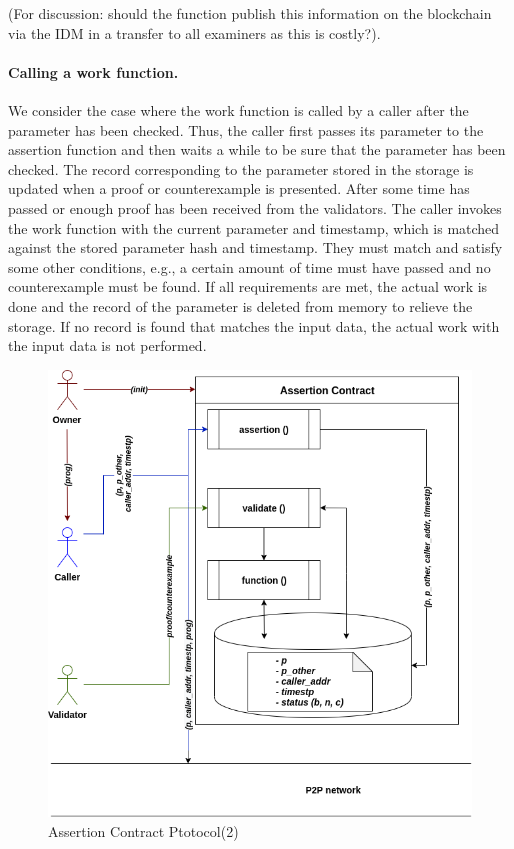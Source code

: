 \documentclass[runningheads]{llncs}
\begin{document}
(For discussion: should the function publish this information on the blockchain via the IDM in a transfer to all examiners as this is costly?).

\paragraph{Calling a work function.}
We consider the case where the work function is called by a caller after the parameter has been checked. Thus, the caller first passes its parameter to the assertion function and then waits a while to be sure that the parameter has been checked. The record corresponding to the parameter stored in the storage is updated when a proof or counterexample is presented. After some time has passed or enough proof has been received from the validators. The caller invokes the work function with the current parameter and timestamp, which is matched against the stored parameter hash and timestamp. They must match and satisfy some other conditions, e.g., a certain amount of time must have passed and no counterexample must be found. If all requirements are met, the actual work is done and the record of the parameter is deleted from memory to relieve the storage. If no record is found that matches the input data, the actual work with the input data is not performed.


\begin{figure}
\centering
\includegraphics[scale=.6]{assertion_2}
\caption{Assertion Contract Ptotocol(2)}
\end{figure}
\end{document}
